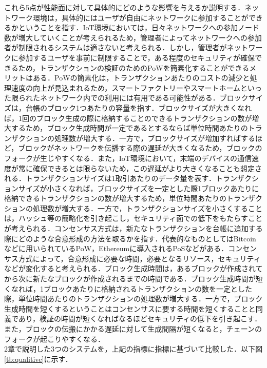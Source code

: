 \documentclass[japanese, macos]{KU2}
\begin{document}
これら5点が性能面に対して具体的にどのような影響を与えるか説明する．ネットワーク環境は，具体的にはユーザが自由にネットワークに参加することができるかということを指す．IoT環境においては，日々ネットワークへの参加ノード数が増大していくことが考えられるため，管理者によってネットワークへの参加者が制限されるシステムは適さないと考えられる．しかし，管理者がネットワークに参加するユーザを事前に制限することで，ある程度のセキュリティが確保できるため，トランザクションの検証のためのPoWを簡素化することができるメリットはある．PoWの簡素化は，トランザクションあたりのコストの減少と処理速度の向上が見込まれるため，スマートファクトリーやスマートホームといった限られたネットワーク内での利用には有用である可能性がある．ブロックサイズは，台帳のブロック1つあたりの容量を指す．ブロックサイズが大きくなれば，1回のブロック生成の際に格納することのできるトランザクションの数が増大するため，ブロック生成時間が一定であるとするならば単位時間あたりのトランザクションの処理数が増大する．一方で，ブロックサイズが増加すればするほど，ブロックがネットワークを伝播する際の遅延が大きくなるため，ブロックのフォークが生じやすくなる．また，IoT環境において，末端のデバイスの通信速度が常に確保できるとは限らないため，この遅延がより大きくなることも想定される．トランザクションサイズは1取引あたりのデータ量を表す．トランザクションサイズが小さくなれば，ブロックサイズを一定とした際1ブロックあたりに格納できるトランザクションの数が増大するため，単位時間あたりのトランザクションの処理数が増大する．一方で，トランザクションサイズを小さくすることは，ハッシュ等の簡略化を引き起こし，セキュリティ面での低下をもたらすことが考えられる．コンセンサス方式は，新たなトランザクションを台帳に追加する際にどのような合意形成の方法を取るかを指す．代表的なものとしてはBitcoinなどに用いられているPoW，Ethereumに導入されるPoSなどがある．コンセンサス方式によって，合意形成に必要な時間，必要となるリソース，セキュリティなどが変化すると考えられる．ブロック生成時間は，あるブロックが作成されてから次に新たなブロックが作成されるまでの時間である．ブロック生成時間が短くなれば，1ブロックあたりに格納されるトランザクションの数を一定とした際，単位時間あたりのトランザクションの処理数が増大する．一方で，ブロック生成時間を短くするということはコンセンサスに要する時間を短くすることと同義であり，検証の時間が短くなればなるほどセキュリティの低下を引き起こす．また，ブロックの伝搬にかかる遅延に対して生成間隔が短くなると，チェーンのフォークが起こりやすくなる．\\

2章で説明した3つのシステムを，上記の指標に指標に基づいて比較した．以下図\ref{tb:qualitive}に示す．
\end{document}
